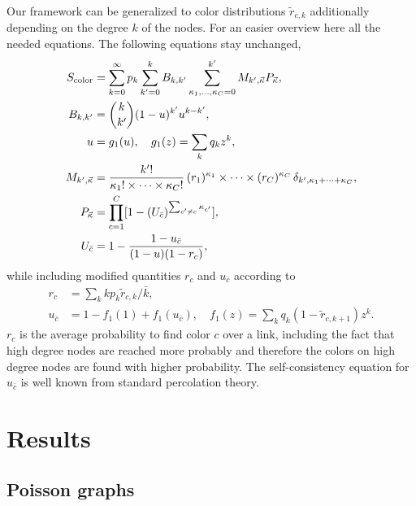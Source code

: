 \documentclass[aps, pre, onecolumn, a4paper, floatfix]{revtex4}
\begin{document}
Our framework can be generalized to color distributions  
${\tilde r}_{c,k}$ additionally depending on the degree $k$ of the nodes. For an easier overview 
here all the needed equations. The following equations stay unchanged, 
\begin{align}
S_{\rm color} &= \sum_{k=0}^{\infty}p_k \sum_{k'=0}^{k} B_{k,k'} 
\sum_{\kappa_1,\dots, \kappa_C=0}^{k'} M_{k',\vec \kappa} 
P_{\vec \kappa},\\
B_{k,k'} &={k \choose k'}(1-u)^{k'}u^{k-k'},\\
u &= g_1(u),\quad g_1(z)=\sum_k q_k z^k,\\
M_{k',\vec \kappa} &=\frac{k'!}{\kappa_1! \times \dots \times \kappa_C!} \,
(r_1)^{\kappa_1} \times \dots \times (r_C)^{\kappa_C}\,
\delta_{k',\kappa_1+\dots + \kappa_C},\\
P_{\vec \kappa} &= \prod_{c=1}^C [1-(U_{\bar c})^{\sum_{c'\neq c} \kappa_{c'} }],\\
U_{\bar c} &= 1 - \frac{1-u_{\bar c}}{(1-u)(1-r_c)},
\end{align}
while including modified quantities $r_c$ and $u_{\bar c}$ according to 
\begin{align}
r_c &= \sum_k k p_k {\tilde r}_{c,k}/{\bar k},\\
u_{\bar c} &= 1- f_1(1) +  f_1(u_{\bar c}),\quad f_1(z)=\sum_k q_k (1-{\tilde r}_{c,k+1}) z^k.
\end{align}
$r_c$ is the average probability to find color $c$ over a link, including the fact that 
high degree nodes are reached more probably and therefore the colors on high degree nodes 
are found with higher probability. The self-consistency equation for $u_{\bar c}$ is 
well known from standard percolation theory. 



\section{Results}

\subsection{Poisson graphs}
\end{document}
